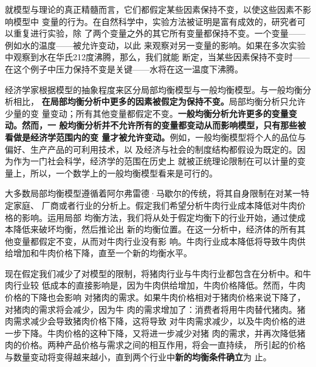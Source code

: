 就模型与理论的真正精髓而言，它们都假定某些因素保持不变，以使这些因素不影响模型中
变量的行为。在自然科学中，实验方法被证明是富有成效的，研究者可以重复进行实验，除
了两个变量之外的其它所有变量都保持不变。一个变量——例如水的温度——被允许变动，以此
来观察对另一变量的影响。如果在多次实验中观察到水在华氏212度沸腾，那么，我们就能
断定，当某些因素保持不变时——在这个例子中压力保持不变是关键——水将在这一温度下沸腾。

经济学家根据模型的抽象程度来区分局部均衡模型与一般均衡模型。与一般均衡分析相比，
\textbf{在局部均衡分析中更多的因素被假定为保持不变。}局部均衡分析只允许少量的变
量变动；所有其他变量都假定不变。\textbf{一般均衡分析允许更多的变量变动。然而，一
般均衡分析并不允许所有的变量都变动从而影响模型，只有那些被看做是经济学范围内的变
量才被允许变动。}例如，一般均衡模型将个人的品位与偏好、生产产品的可利用技术，以
及经济与社会的制度结构都假设为既定的。因为作为一门社会科学，经济学的范围在历史上
就被正统理论限制在可以计量的变量上，所以，一个数学上的一般均衡模型看来是可行的。

大多数局部均衡模型遵循着阿尔弗雷德·马歇尔的传统，将其自身限制在对某一特定家庭、
厂商或者行业的分析上。假定我们希望分析牛肉行业成本降低对牛肉价格的影响。运用局部
均衡方法，我们将从处于假定均衡下的行业开始，通过使成本降低来破坏均衡，然后推论出
新的均衡位置。在这一分析中，经济体的所有其他变量都假定不变，从而对牛肉行业没有影
响。牛肉行业成本降低将导致牛肉供给增加和牛肉价格下降，直至一个新的均衡水平。

现在假定我们减少了对模型的限制，将猪肉行业与牛肉行业都包含在分析中。和牛肉行业较
低成本的直接影响是，因为牛肉供给增加，牛肉价格降低。然而，牛肉价格的下降也会影响
对猪肉的需求。如果牛肉价格相对于猪肉价格来说下降了，对猪肉的需求将会减少，因为牛
肉的需求增加了：消费者将用牛肉替代猪肉。猪肉需求减少会导致猪肉价格下降，这将导致
对牛肉需求减少，以及牛肉价格的进一步下降。牛肉价格的这种下降，又将进一步减少对猪
肉的需求，并再次降低猪肉的价格。两种产品价格与需求之间的相互作用，将会一直持续，
所引起的价格与数量变动将变得越来越小，直到两个行业中\textbf{新的均衡条件确立}为
止。

